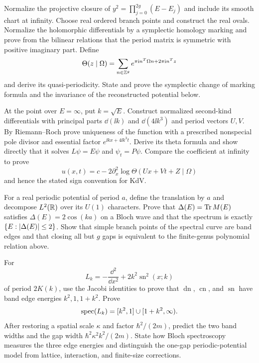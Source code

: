 \begin{exercise}
Normalize the projective closure of
$y^2=\prod_{j=0}^{2g}(E-E_j)$ and include its smooth chart at infinity.
Choose real ordered branch points and construct the real ovals.  Normalize
the holomorphic differentials by a symplectic homology marking and prove from
the bilinear relations that the period matrix is symmetric with positive
imaginary part.  Define
\[
 \Theta(z\mid\Omega)=\sum_{n\in\mathbb Z^g}
 e^{\pi\mathrm i n^T\Omega n+2\pi\mathrm i n^Tz}
\]
and derive its quasi-periodicity.  State and prove the symplectic change of
marking formula and the invariance of the reconstructed potential below.
\end{exercise}

\begin{exercise}
At the point over $E=\infty$, put $k=\sqrt E$.  Construct normalized
second-kind differentials with principal parts $\dd(\ii k)$ and
$\dd(4\ii k^3)$ and period vectors $U,V$.  By Riemann--Roch prove uniqueness
of the function with a prescribed nonspecial pole divisor and essential
factor $e^{\ii kx+4\ii k^3t}$.  Derive its theta formula and show directly
that it solves $L\psi=E\psi$ and $\psi_t=P\psi$.  Compare the coefficient at
infinity to prove
\[
 u(x,t)=c-2\partial_x^2\log\Theta(Ux+Vt+Z\mid\Omega)
\]
and hence the stated sign convention for KdV.
\end{exercise}

\begin{exercise}
For a real periodic potential of period $a$, define the translation by $a$
and decompose $L^2(\mathbb R)$ over its $U(1)$ characters.  Prove that
$\Delta(E)=\operatorname{Tr} M(E)$ satisfies
$\Delta(E)=2\cos(ka)$ on a Bloch wave and that the spectrum is exactly
$\{E:\left\lvert \Delta(E)\right\rvert\le2\}$.  Show that simple branch points of the spectral
curve are band edges and that closing all but $g$ gaps is equivalent to the
finite-genus polynomial relation above.
\end{exercise}

\begin{exercise}
For
\[
 L_k=-\frac{\dd^2}{\dd x^2}+2k^2\operatorname{sn}^2(x;k)
\]
of period $2K(k)$, use the Jacobi identities to prove that
$\operatorname{dn}$, $\operatorname{cn}$, and $\operatorname{sn}$ have band
edge energies $k^2,1,1+k^2$.  Prove
\[
 \operatorname{spec}(L_k)=[k^2,1]\cup[1+k^2,\infty).
\]
After restoring a spatial scale $\kappa$ and factor $\hbar^2/(2m)$, predict
the two band widths and the gap width
$\hbar^2\kappa^2k^2/(2m)$.  State how Bloch spectroscopy measures the three
edge energies and distinguish the one-gap periodic-potential model from
lattice, interaction, and finite-size corrections.
\end{exercise}

